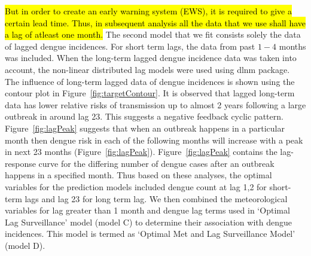 \documentclass{bmcart}
\begin{document}




\hl{But in order to create an early warning system (EWS), it is required to give a certain lead time. Thus, in subsequent analysis all the data that we use shall have a lag of atleast one month.}  The second model that we fit consists solely the data of lagged dengue incidences. For short term lags, the data from past $1-4$ months was included. When the long-term lagged dengue incidence data was taken into account, the non-linear distributed lag models were used using dlnm package\cite{gasparrini2011distributed}. The influence of long-term lagged data of dengue incidences is shown using the contour plot in Figure~\ref{fig:targetContour}. It is observed that lagged long-term data has lower relative risks of transmission up to almost 2 years following a large outbreak in around lag 23. This suggests a negative feedback cyclic pattern. Figure~\ref{fig:lagPeak} suggests that when an outbreak happens in a particular month then dengue risk in each of the following months will increase with a peak in next 23 months (Figure~\ref{fig:lagPeak}). %
Figure~\ref{fig:lagPeak} contains the lag-response curve for the differing number of dengue cases after an outbreak happens in a specified month. Thus based on these  analyses, the optimal variables for the prediction models included dengue count at lag 1,2 for short-term lags and lag 23 for long term lag. We then combined the meteorological variables for lag greater than 1 month and dengue lag terms used in `Optimal Lag Surveillance' model (model C) to determine their association with dengue incidences. This model is termed as `Optimal Met and Lag Surveillance Model' (model D). 
\end{document}
